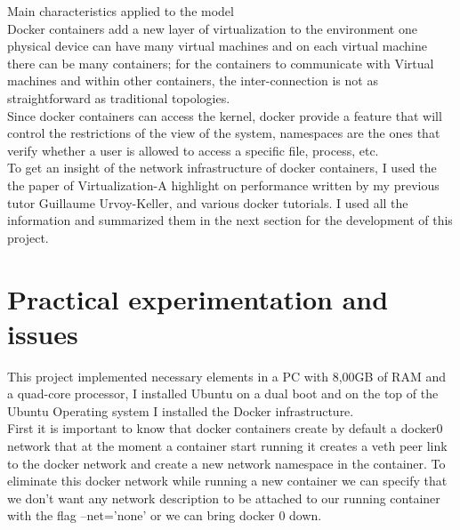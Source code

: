 Main characteristics applied to the model\\

Docker containers add a new layer of virtualization to the environment one physical device can have many virtual machines and on each virtual machine there can be many containers; for the containers to communicate with Virtual machines and within other containers, the inter-connection is not as straightforward as traditional topologies.\\

Since docker containers can access the kernel, docker provide a feature that will control the restrictions of the view of the system, namespaces are the ones that verify whether a user is allowed to access a specific file, process, etc.\\

To get an insight of the network infrastructure of docker containers, I used the the paper of Virtualization-A highlight on performance \cite{3} written by my previous tutor Guillaume Urvoy-Keller, and various docker tutorials\cite{4}. I used all the information and summarized them in the next section for the development of this project.\\

\section{Practical experimentation and issues}

This project implemented necessary elements in a PC with 8,00GB of RAM and a quad-core processor, I installed Ubuntu on a dual boot and on the top of the Ubuntu Operating system I installed the Docker infrastructure.\\

First it is important to know that docker containers create by default a docker0 network that at the moment a container start running it creates a veth peer link to the docker network and create a new network namespace in the container. To  eliminate this docker network while running a new container we can specify that we don’t want any network description to be attached to our running container with the flag –net=’none’   or we can  bring docker 0 down.\\


